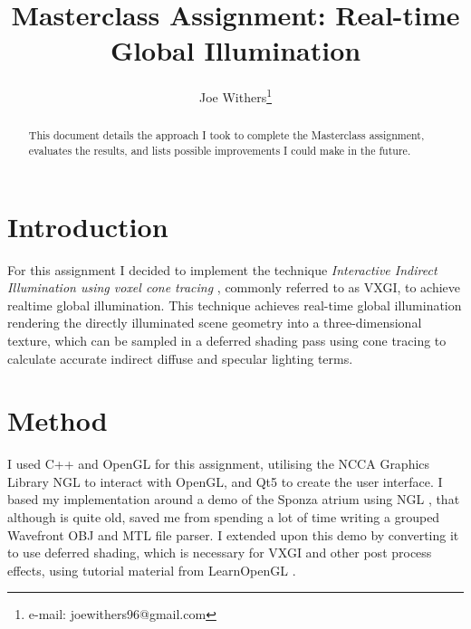 \documentclass[]{acmsiggraph}
\title{Masterclass Assignment: Real-time Global Illumination}
\author{Joe Withers\thanks{e-mail: joewithers96@gmail.com}}
\begin{document}

\maketitle

\begin{abstract}
This document details the approach I took to complete the Masterclass assignment, evaluates the results, and lists possible improvements I could make in the future.
\end{abstract}

\section{Introduction}
For this assignment I decided to implement the technique \textit{Interactive Indirect Illumination using voxel cone tracing} \cite{crassinneyretsainzgreeneisemann2011}, commonly referred to as VXGI, to achieve realtime global illumination. This technique achieves real-time global illumination rendering the directly illuminated scene geometry into a three-dimensional texture, which can be sampled in a deferred shading pass using cone tracing to calculate accurate indirect diffuse and specular lighting terms.

\section{Method}
I used C++ and OpenGL for this assignment, utilising the NCCA Graphics Library NGL \cite{ngl} to interact with OpenGL, and Qt5 to create the user interface. I based my implementation around a demo of the Sponza atrium using NGL \cite{pbrSponza}, that although is quite old, saved me from spending a lot of time writing a grouped Wavefront OBJ and MTL file parser. I extended upon this demo by converting it to use deferred shading, which is necessary for VXGI and other post process effects, using tutorial material from LearnOpenGL \cite{learnDeferred}.
\end{document}
